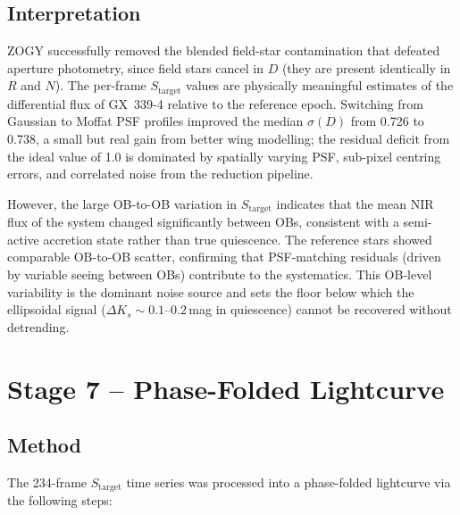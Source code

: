 \documentclass[12pt,a4paper]{article}
\begin{document}
\subsection{Interpretation}
ZOGY successfully removed the blended field-star contamination that
defeated aperture photometry, since field stars cancel in $D$ (they are
present identically in $R$ and $N$).  The per-frame $S_\mathrm{target}$
values are physically meaningful estimates of the differential flux of
GX~339-4 relative to the reference epoch.  Switching from Gaussian to
Moffat PSF profiles improved the median $\sigma(D)$ from 0.726 to 0.738,
a small but real gain from better wing modelling; the residual deficit
from the ideal value of 1.0 is dominated by spatially varying PSF,
sub-pixel centring errors, and correlated noise from the reduction
pipeline.

However, the large OB-to-OB variation in $S_\mathrm{target}$ indicates
that the mean NIR flux of the system changed significantly between OBs,
consistent with a semi-active accretion state rather than true quiescence.
The reference stars showed comparable OB-to-OB scatter, confirming that
PSF-matching residuals (driven by variable seeing between OBs) contribute
to the systematics.  This OB-level variability is the dominant noise
source and sets the floor below which the ellipsoidal signal
($\Delta K_s \sim 0.1$--$0.2$\,mag in quiescence) cannot be recovered
without detrending.

\section{Stage 7 -- Phase-Folded Lightcurve}

\subsection{Method}
The 234-frame $S_\mathrm{target}$ time series was processed into a
phase-folded lightcurve via the following steps:
\end{document}

